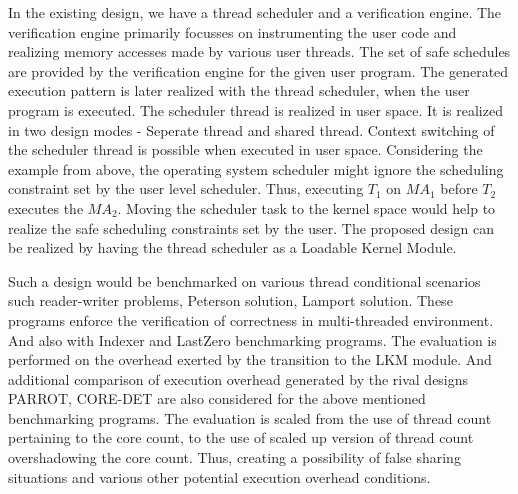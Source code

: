 \documentclass[12pt]{article}
\begin{document}
In the existing design, we have a thread scheduler and a verification engine.  
The verification engine primarily focusses on instrumenting the user code and realizing memory accesses made by various user threads. 
The set of safe schedules are provided by the verification engine for the given user program. 
The generated execution pattern is later realized with the thread scheduler, when the user program is executed. 
The scheduler thread is realized in user space. 
It is realized in two design modes - Seperate thread and shared thread. 
Context switching of the scheduler thread is possible when executed in user space. 
Considering the example from above, the operating system scheduler might ignore the scheduling constraint set by the user level scheduler. 
Thus, executing $T_{1}$ on $MA_{1}$ before $T_{2}$ executes the $MA_{2}$. 
Moving the scheduler task to the kernel space would help to realize the safe scheduling constraints set by the user. 
The proposed design can be realized by having the thread scheduler as a Loadable Kernel Module. 


Such a design would be benchmarked on various thread conditional scenarios such reader-writer problems, Peterson solution, Lamport solution. 
These programs enforce the verification of correctness in multi-threaded environment. 
And also with Indexer and LastZero benchmarking programs. 
The evaluation is performed on the overhead exerted by the transition to the LKM module. 
And additional comparison of execution overhead generated by the rival designs PARROT, CORE-DET are also considered for the above mentioned benchmarking programs. 
The evaluation is scaled from the use of thread count pertaining to the core count, to the use of scaled up version of thread count overshadowing the core count. 
Thus, creating a possibility of false sharing situations and various other potential execution overhead conditions. 
\end{document}
